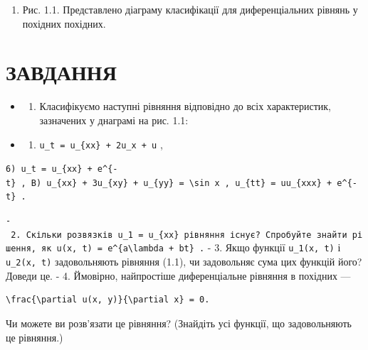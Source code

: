 \documentclass[
  ukrainian,
]{article}
\providecommand{\tightlist}{%
  \setlength{\itemsep}{0pt}\setlength{\parskip}{0pt}}
\begin{document}
\begin{enumerate}
\def\labelenumi{\arabic{enumi}.}
\setcounter{enumi}{2}
\tightlist
\item
  Рис. 1.1. Представлено діаграму класифікації для диференціальних
  рівнянь у похідних похідних.
\end{enumerate}

\section{ЗАВДАННЯ}\label{ux437ux430ux432ux434ux430ux43dux43dux44f}

\begin{itemize}
\tightlist
\item
  \begin{enumerate}
  \def\labelenumi{\arabic{enumi}.}
  \tightlist
  \item
    Класифікуємо наступні рівняння відповідно до всіх характеристик,
    зазначених у днаграмі на рис. 1.1:
  \end{enumerate}
\item
  \begin{enumerate}
  \def\labelenumi{\alph{enumi})}
  \tightlist
  \item
    \texttt{u\_t\ =\ u\_\{xx\}\ +\ 2u\_x\ +\ u} ,
  \end{enumerate}
\end{itemize}

\texttt{6)\ \textquotesingle{}u\_t\ =\ u\_\{xx\}\ +\ e\^{}\{-t\}\textquotesingle{}\ ,\ B)\ \textquotesingle{}u\_\{xx\}\ +\ 3u\_\{xy\}\ +\ u\_\{yy\}\ =\ \textbackslash{}sin\ x\textquotesingle{}\ ,\ \textquotesingle{}u\_\{tt\}\ =\ uu\_\{xxx\}\ +\ e\^{}\{-t\}\textquotesingle{}\ .}

\texttt{-\ 2.\ Скільки\ розв\textquotesingle{}язків\ \textquotesingle{}u\_1\ =\ u\_\{xx\}\textquotesingle{}\ рівняння\ існує?\ Спробуйте\ знайти\ рішення,\ як\ \textquotesingle{}u(x,\ t)\ =\ e\^{}\{a\textbackslash{}lambda\ +\ bt\}\textquotesingle{}\ .}
- 3. Якщо функції \texttt{u\_1(x,\ t)} і \texttt{u\_2(x,\ t)}
задовольняють рівняння (1.1), чи задовольняє сума цих функцій його?
Доведи це. - 4. Ймовірно, найпростіше диференціальне рівняння в похідних
---

\begin{verbatim}
\frac{\partial u(x, y)}{\partial x} = 0.
\end{verbatim}

Чи можете ви розв'язати це рівняння? (Знайдіть усі функції, що
задовольняють це рівняння.)
\end{document}
